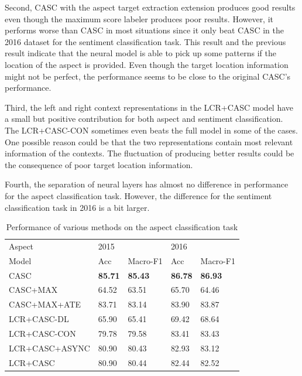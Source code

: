 \documentclass[american, oneside]{ecsgdp}
\begin{document}
Second, CASC with the aspect target extraction extension produces good results even though the maximum score labeler produces poor results. However, it performs worse than CASC in most situations since it only beat CASC in the 2016 dataset for the sentiment classification task. This result and the previous result indicate that the neural model is able to pick up some patterns if the location of the aspect is provided. Even though the target location information might not be perfect, the performance seems to be close to the original CASC's performance.

Third, the left and right context representations in the LCR+CASC model have a small but positive contribution for both aspect and sentiment classification. The LCR+CASC-CON sometimes even beats the full model in some of the cases. One possible reason could be that the two representations contain most relevant information of the contexts. The fluctuation of producing better results could be the consequence of poor target location information.

Fourth, the separation of neural layers has almost no difference in performance for the aspect classification task. However, the difference for the sentiment classification task in 2016 is a bit larger.

\begin{table}[htbp]
\centering
\caption{Performance of various methods on the aspect classification task}
\label{tab:aspect-perf}
\begin{tabular}{@{\extracolsep{4pt}}lllll@{}}
\hline
Aspect         & 2015           &                & 2016           &                \\ \cline{2-3} \cline{4-5}
Model          & Acc            & Macro-F1       & Acc            & Macro-F1       \\ \hline
CASC           & \textbf{85.71} & \textbf{85.43} & \textbf{86.78} & \textbf{86.93} \\
CASC+MAX       & 64.52          & 63.51          & 65.70          & 64.46          \\
CASC+MAX+ATE   & 83.71          & 83.14          & 83.90          & 83.87          \\
LCR+CASC-DL    & 65.90          & 65.41          & 69.42          & 68.64          \\
LCR+CASC-CON   & 79.78          & 79.58          & 83.41          & 83.43          \\
LCR+CASC+ASYNC & 80.90	        & 80.43	         &82.93	          & 83.12          \\
LCR+CASC       & 80.90          & 80.44          & 82.44          & 82.52          \\ \hline
\end{tabular}%
\end{table}
\end{document}
